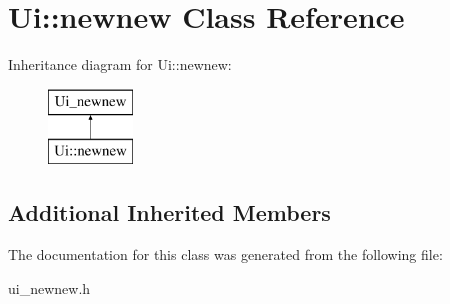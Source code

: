 \hypertarget{class_ui_1_1newnew}{}\section{Ui\+:\+:newnew Class Reference}
\label{class_ui_1_1newnew}
Inheritance diagram for Ui\+:\+:newnew\+:\begin{figure}[H]
\begin{center}
\leavevmode
\includegraphics[height=2.000000cm]{class_ui_1_1newnew}
\end{center}
\end{figure}
\subsection*{Additional Inherited Members}


The documentation for this class was generated from the following file\+:\begin{DoxyCompactItemize}
\item 
ui\+\_\+newnew.\+h\end{DoxyCompactItemize}
